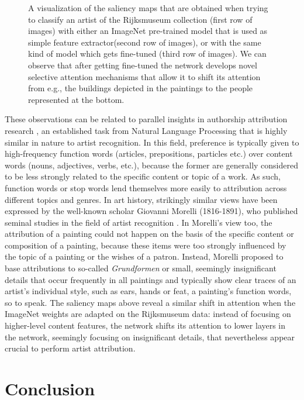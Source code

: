 \begin{figure}[!htb]
\endminipage

\caption{A visualization of the saliency maps that are obtained when trying to classify an artist of the Rijksmuseum collection (first row of images) with either an ImageNet pre-trained model that is used as simple feature extractor(second row of images), or with the same kind of model which gets fine-tuned (third row of images). We can observe that after getting fine-tuned the network develops novel selective attention mechanisms that allow it to shift its attention from e.g., the buildings depicted in the paintings to the people represented at the bottom.}
\label{fig:saliency_maps}
\end{figure}


These observations can be related to parallel insights in authorship attribution research \cite{stamatatos:2009}, an established task from Natural Language Processing that is highly similar in nature to artist recognition. In this field, preference is typically given to high-frequency function words (articles, prepositions, particles etc.) over content words (nouns, adjectives, verbs, etc.), because the former are generally considered to be less strongly related to the specific content or topic of a work. As such, function words or stop words lend themselves more easily to attribution across different topics and genres. In art history, strikingly similar views have been expressed by the well-known scholar Giovanni Morelli (1816-1891), who published seminal studies in the field of artist recognition \cite{wollheim:1972}. In Morelli's view too, the attribution of a painting could not happen on the basis of the specific content or composition of a painting, because these items were too strongly influenced by the topic of a painting or the wishes of a patron. Instead, Morelli proposed to base attributions to so-called \emph{Grundformen} or small, seemingly insignificant details that occur frequently in all paintings and typically show clear traces of an artist's individual style, such as ears, hands or feat, a painting's function words, so to speak. The saliency maps above reveal a similar shift in attention when the ImageNet weights are adapted on the Rijksmuseum data: instead of focusing on higher-level content features, the network shifts its attention to lower layers in the network, seemingly focusing on insignificant details, that nevertheless appear crucial to perform artist attribution.


\section{Conclusion} 
\label{sec:ch_4_conclusion}
 
